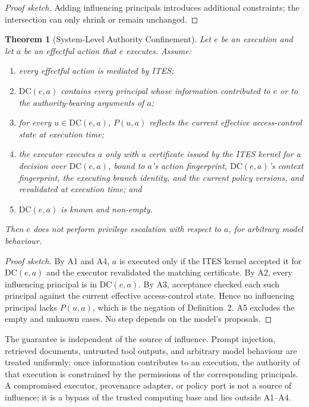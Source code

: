 \documentclass[11pt]{article}
\newtheorem{theorem}{Theorem}
\begin{document}
\begin{proof}[Proof sketch]
Adding influencing principals introduces additional constraints; the
intersection can only shrink or remain unchanged.
\end{proof}

\begin{theorem}[System-Level Authority Confinement]
Let $e$ be an execution and let $a$ be an effectful action that $e$
executes. Assume:
\begin{enumerate}
  \item[(A1)] every effectful action is mediated by ITES;
  \item[(A2)] $\mathrm{DC}(e,a)$ contains every principal whose information
        contributed to $e$ or to the authority-bearing arguments of $a$;
  \item[(A3)] for every $u \in \mathrm{DC}(e,a)$, $P(u,a)$ reflects the
        current effective access-control state at execution time;
  \item[(A4)] the executor executes $a$ only with a certificate issued by
        the ITES kernel for a decision over $\mathrm{DC}(e,a)$, bound to
        $a$'s action fingerprint, $\mathrm{DC}(e,a)$'s context fingerprint,
        the executing branch identity, and the current policy versions, and
        revalidated at execution time; and
  \item[(A5)] $\mathrm{DC}(e,a)$ is known and non-empty.
\end{enumerate}
Then $e$ does not perform privilege escalation with respect to $a$, for
arbitrary model behaviour.
\end{theorem}

\begin{proof}[Proof sketch]
By A1 and A4, $a$ is executed only if the ITES kernel accepted it for
$\mathrm{DC}(e,a)$ and the executor revalidated the matching certificate.
By A2, every influencing principal is in $\mathrm{DC}(e,a)$. By A3,
acceptance checked each such principal against the current effective
access-control state. Hence no influencing principal lacks $P(u,a)$, which
is the negation of Definition~2. A5 excludes the empty and unknown cases.
No step depends on the model's proposals.
\end{proof}

The guarantee is independent of the source of influence. Prompt injection,
retrieved documents, untrusted tool outputs, and arbitrary model behaviour
are treated uniformly: once information contributes to an execution, the
authority of that execution is constrained by the permissions of the
corresponding principals. A compromised executor, provenance adapter, or
policy port is not a source of influence; it is a bypass of the trusted
computing base and lies outside A1--A4.
\end{document}
